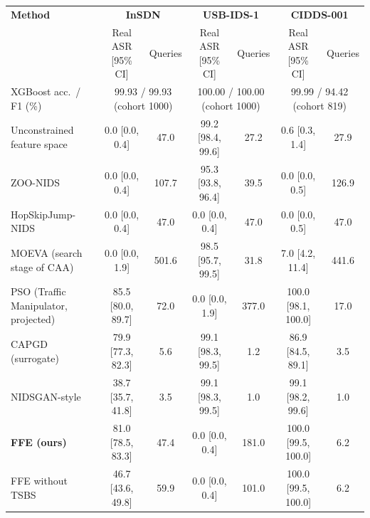 \begin{tabular}{@{}lcccccc@{}}
\toprule
\textbf{Method} & \multicolumn{2}{c}{\textbf{InSDN}} & \multicolumn{2}{c}{\textbf{USB-IDS-1}} & \multicolumn{2}{c}{\textbf{CIDDS-001}} \\
 & Real ASR [95\% CI] & Queries & Real ASR [95\% CI] & Queries & Real ASR [95\% CI] & Queries \\
\midrule
XGBoost acc.\ / F1 (\%) & \multicolumn{2}{c}{99.93 / 99.93 (cohort 1000)} & \multicolumn{2}{c}{100.00 / 100.00 (cohort 1000)} & \multicolumn{2}{c}{99.99 / 94.42 (cohort 819)} \\
\midrule
Unconstrained feature space & 0.0 [0.0, 0.4] & 47.0 & 99.2 [98.4, 99.6] & 27.2 & 0.6 [0.3, 1.4] & 27.9 \\
ZOO-NIDS & 0.0 [0.0, 0.4] & 107.7 & 95.3 [93.8, 96.4] & 39.5 & 0.0 [0.0, 0.5] & 126.9 \\
HopSkipJump-NIDS & 0.0 [0.0, 0.4] & 47.0 & 0.0 [0.0, 0.4] & 47.0 & 0.0 [0.0, 0.5] & 47.0 \\
MOEVA (search stage of CAA) & 0.0 [0.0, 1.9] & 501.6 & 98.5 [95.7, 99.5] & 31.8 & 7.0 [4.2, 11.4] & 441.6 \\
PSO (Traffic Manipulator, projected) & 85.5 [80.0, 89.7] & 72.0 & 0.0 [0.0, 1.9] & 377.0 & 100.0 [98.1, 100.0] & 17.0 \\
CAPGD (surrogate) & 79.9 [77.3, 82.3] & 5.6 & 99.1 [98.3, 99.5] & 1.2 & 86.9 [84.5, 89.1] & 3.5 \\
NIDSGAN-style & 38.7 [35.7, 41.8] & 3.5 & 99.1 [98.3, 99.5] & 1.0 & 99.1 [98.2, 99.6] & 1.0 \\
\textbf{FFE (ours)} & 81.0 [78.5, 83.3] & 47.4 & 0.0 [0.0, 0.4] & 181.0 & 100.0 [99.5, 100.0] & 6.2 \\
FFE without TSBS & 46.7 [43.6, 49.8] & 59.9 & 0.0 [0.0, 0.4] & 101.0 & 100.0 [99.5, 100.0] & 6.2 \\
\bottomrule
\end{tabular}
